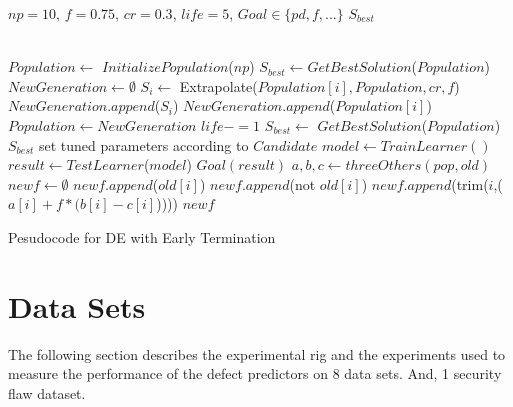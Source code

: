 \documentclass[12pt]{IEEEtran}
\begin{document}
\begin{algorithm}[htbp!]
  
  \scriptsize
  \begin{algorithmic}[1]
    \Require $\mathit{np} = 10$, $f=0.75$, $cr=0.3$, $\mathit{life} = 5$, $\mathit{Goal} \in \{\mathit{pd},f,...\}$
    \Ensure $S_{best}$
    
    ~\\
    \State $Population  \gets $ $InitializePopulation$($\mathit{np}$)   
    \State $S_{best} \gets $$GetBestSolution$($Population $)
    \State $NewGeneration \gets \emptyset$
    \State $S_i \gets$ Extrapolate($Population [i], Population , cr, f$)
    \State $NewGeneration$.$append$($S_i$)
    \Else
    \State $NewGeneration$.$append$($Population [i]$)
    \EndIf
    \EndFor
    \State $Population  \gets NewGeneration$
    \State $life -=1$
    \EndIf
    \State $S_{best} \gets$ $GetBestSolution$($Population $)
    \EndWhile
    \State \Return $S_{best}$
    \EndFunction
    \State set tuned parameters according to $Candidate$
    \State $model \gets$$TrainLearner()$
    \State $result \gets$$TestLearner$($model$)   
    \State \Return$\mathit{Goal}(result)$  
    \EndFunction
    \State $a, b, c\gets threeOthers(pop,old)$  
    \State $newf \gets \emptyset$
    \State $newf$.$append$($old[i]$)
    \Else
    \State $newf$.$append$(not $old[i]$)
    \Else
    \State $newf$.$append$(trim($i$,($a[i] + f * (b[i] - c[i]$)))) 
    \EndIf
    \EndIf
    \EndFor
    \State \Return $newf$
    \EndFunction
  \end{algorithmic} 
  \caption{Pesudocode for DE with Early Termination}
  \label{alg:DE}
\end{algorithm}



\section{Data Sets}

The following section describes the experimental rig and the experiments used to measure the performance of the defect predictors on 8 data sets. And, 1 security flaw dataset.
\end{document}
